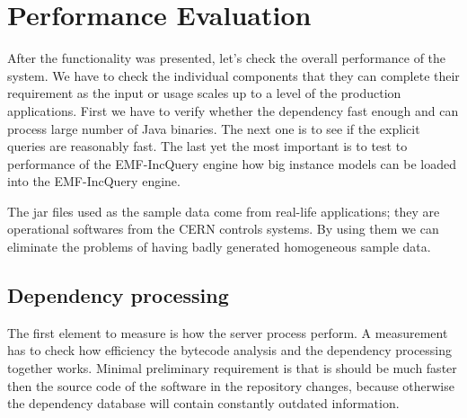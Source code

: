 \chapter{Performance Evaluation}

After the functionality was presented, let's check the overall performance of
the system. We have to check the individual components  that they can complete
their requirement as the input or usage scales up to a level of the production
applications. First we have to verify whether the dependency fast enough and can
process large number of Java binaries. The next one is to see if the explicit
queries are reasonably fast. The last yet the most important is to test to
performance of the EMF-IncQuery engine how big instance models can be loaded
into the EMF-IncQuery engine.

The jar files used as the sample data come from real-life applications; they are
operational softwares from the CERN controls systems. By using them we can
eliminate the problems of having badly generated homogeneous sample data.

\section{Dependency processing}
\label{sect:depproc}
The first element to measure is how the server process perform.
A measurement has to check how efficiency the bytecode analysis and the
dependency processing together works. Minimal preliminary requirement is that is
should be much faster then the source code of the software in  the repository
changes, because otherwise the dependency database will contain constantly
outdated information.

